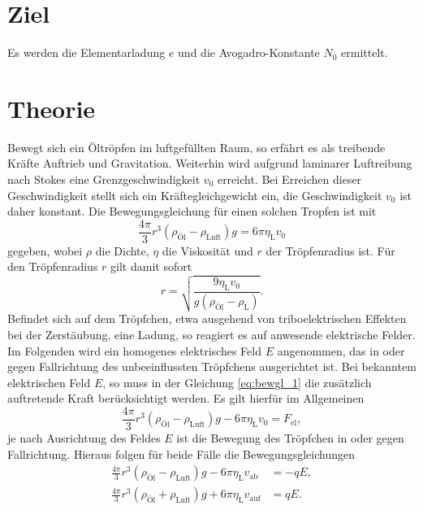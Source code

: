 \section*{Ziel}

Es werden die Elementarladung $e$  und die Avogadro-Konstante $N_0$ ermittelt.
\section{Theorie}
\label{sec:Theorie}

Bewegt sich ein Öltröpfen im luftgefüllten Raum, so erfährt es als treibende Kräfte Auftrieb und Gravitation.
Weiterhin wird aufgrund laminarer Luftreibung nach Stokes eine Grenzgeschwindigkeit $v_0$ erreicht.
Bei Erreichen dieser Geschwindigkeit stellt sich ein Kräftegleichgewicht ein,
die Geschwindigkeit $v_0$ ist daher konstant.
Die Bewegungsgleichung für einen solchen Tropfen ist mit
\begin{equation}
	\frac{4\pi}{3}r^3(\rho_\text{Öl}-\rho_\text{Luft})g=6\pi\eta_\text{L}v_0
	\label{eq:bewgl_1}
\end{equation}
gegeben, wobei $\rho$ die Dichte, $\eta$ die Viskosität und $r$ der Tröpfenradius ist.
Für den Tröpfenradius $r$ gilt damit sofort
\begin{equation}
	r=\sqrt{\frac{9\eta_\text{L}v_0}{g(\rho_\text{Öl}-\rho_\text{L})}}.
	\label{eq:radius_v0}
\end{equation}
Befindet sich auf dem Tröpfchen, etwa ausgehend von triboelektrischen Effekten bei der Zerstäubung,
eine Ladung, so reagiert es auf anwesende elektrische Felder.
Im Folgenden wird ein homogenes elektrisches Feld $E$ angenommen, das in oder gegen Fallrichtung des unbeeinflussten Tröpfchens ausgerichtet ist. %
Bei bekanntem elektrischen Feld $E$, so muss in der Gleichung \ref{eq:bewgl_1} die zusätzlich auftretende Kraft berücksichtigt werden.
Es gilt hierfür im Allgemeinen
\begin{equation}
	\frac{4\pi}{3}r^3(\rho_\text{Öl}-\rho_\text{Luft})g-6\pi\eta_\text{L}v_0= F_\text{el},
	\label{eq:bewgl_2a}
\end{equation}
je nach Ausrichtung des Feldes $E$ ist die Bewegung des Tröpfchen in oder gegen Fallrichtung.
Hieraus folgen für beide Fälle die Bewegungsgleichungen
\begin{align}
	\frac{4\pi}{3}r^3(\rho_\text{Öl}-\rho_\text{Luft})g-6\pi\eta_\text{L}v_\text{ab} &= -q E,\\
	\frac{4\pi}{3}r^3(\rho_\text{Öl}+\rho_\text{Luft})g+6\pi\eta_\text{L}v_\text{auf}&= q E.
	\label{eq:bewgl_2}
\end{align}

